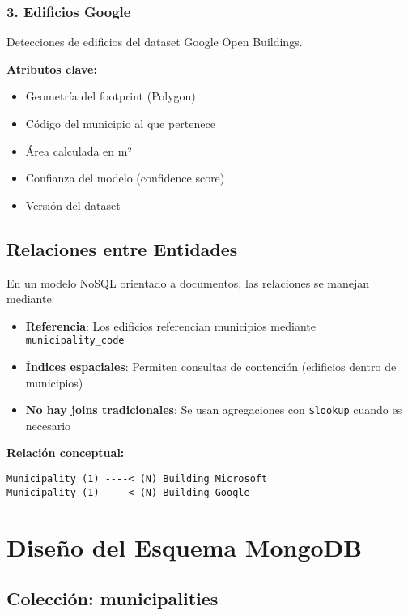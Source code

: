\documentclass[12pt,a4paper]{article}
\begin{document}
\subsubsection{3. Edificios Google}

Detecciones de edificios del dataset Google Open Buildings.

\textbf{Atributos clave:}
\begin{itemize}
    \item Geometría del footprint (Polygon)
    \item Código del municipio al que pertenece
    \item Área calculada en m²
    \item Confianza del modelo (confidence score)
    \item Versión del dataset
\end{itemize}

\subsection{Relaciones entre Entidades}

En un modelo NoSQL orientado a documentos, las relaciones se manejan mediante:

\begin{itemize}[leftmargin=*]
    \item \textbf{Referencia}: Los edificios referencian municipios mediante \texttt{municipality\_code}
    \item \textbf{Índices espaciales}: Permiten consultas de contención (edificios dentro de municipios)
    \item \textbf{No hay joins tradicionales}: Se usan agregaciones con \texttt{\$lookup} cuando es necesario
\end{itemize}

\textbf{Relación conceptual:}
\begin{verbatim}
Municipality (1) ----< (N) Building Microsoft
Municipality (1) ----< (N) Building Google
\end{verbatim}

\newpage
\section{Diseño del Esquema MongoDB}

\subsection{Colección: municipalities}
\end{document}
